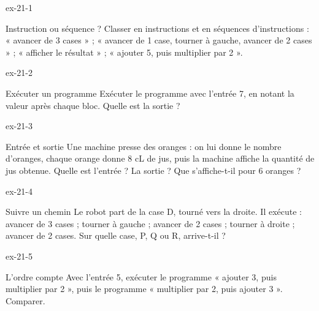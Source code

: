\clearpage{}
\begin{blocLivre}{ex-21-1}\begin{exercice}[1]{Instruction ou séquence ?}
Classer en instructions et en séquences d’instructions : « avancer de 3 cases » ; « avancer de 1 case, tourner à gauche, avancer de 2 cases » ; « afficher le résultat » ; « ajouter 5, puis multiplier par 2 ».
\end{exercice}\end{blocLivre}
\begin{blocLivre}{ex-21-2}\begin{exercice}[1]{Exécuter un programme}
Exécuter le programme avec l’entrée 7, en notant la valeur après chaque bloc. Quelle est la sortie ?
\label{fig-ex-21-2}
\end{exercice}\end{blocLivre}
\begin{blocLivre}{ex-21-3}\begin{exercice}[1]{Entrée et sortie}
Une machine presse des oranges : on lui donne le nombre d’oranges, chaque orange donne 8 cL de jus, puis la machine affiche la quantité de jus obtenue. Quelle est l’entrée ? La sortie ? Que s’affiche-t-il pour 6 oranges ?
\end{exercice}\end{blocLivre}
\begin{blocLivre}{ex-21-4}\begin{exercice}[1]{Suivre un chemin}
Le robot part de la case D, tourné vers la droite. Il exécute : avancer de 3 cases ; tourner à gauche ; avancer de 2 cases ; tourner à droite ; avancer de 2 cases. Sur quelle case, P, Q ou R, arrive-t-il ?
\label{fig-ex-21-4}
\end{exercice}\end{blocLivre}
\begin{blocLivre}{ex-21-5}\begin{exercice}[1]{L’ordre compte}
Avec l’entrée 5, exécuter le programme « ajouter 3, puis multiplier par 2 », puis le programme « multiplier par 2, puis ajouter 3 ». Comparer.
\end{exercice}\end{blocLivre}


